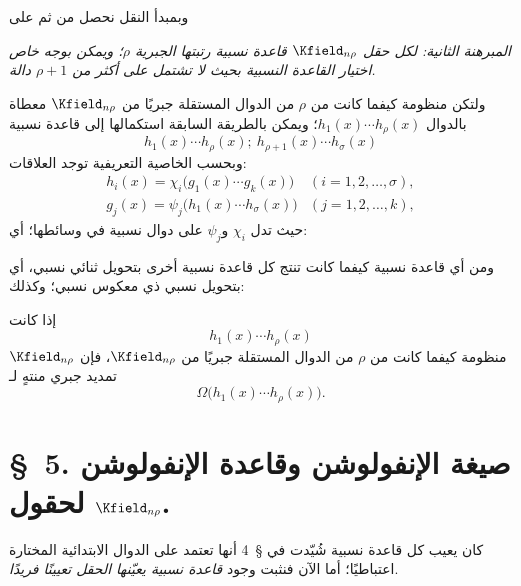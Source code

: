 \documentclass[11pt]{article}
\begin{document}
وبمبدأ النقل نحصل من ثم على

\emph{المبرهنة الثانية: لكل حقل $\Kfield_{n\rho}$ قاعدة نسبية رتبتها الجبرية $\rho$؛ ويمكن بوجه خاص اختيار القاعدة النسبية بحيث لا تشتمل على أكثر من $\rho+1$ دالة.}

ولتكن منظومة كيفما كانت من $\rho$ من الدوال المستقلة جبريًا من $\Kfield_{n\rho}$ معطاة بالدوال $h_1(x)\cdots h_\rho(x)$؛ ويمكن بالطريقة السابقة استكمالها إلى قاعدة نسبية
\[
h_1(x)\cdots h_\rho(x);\ h_{\rho+1}(x)\cdots h_\sigma(x)
\]
وبحسب الخاصية التعريفية توجد العلاقات:
\[
\begin{array}{ll}
h_i(x)=\chi_i\bigl(g_1(x)\cdots g_k(x)\bigr)&(i=1,2,\ldots,\sigma),\\
g_j(x)=\psi_j\bigl(h_1(x)\cdots h_\sigma(x)\bigr)&(j=1,2,\ldots,k),
\end{array}
\]
حيث تدل $\chi_i$ و$\psi_j$ على دوال نسبية في وسائطها؛ أي:

ومن أي قاعدة نسبية كيفما كانت تنتج كل قاعدة نسبية أخرى بتحويل ثنائي نسبي، أي بتحويل نسبي ذي معكوس نسبي؛ وكذلك:

إذا كانت
\[
h_1(x)\cdots h_\rho(x)
\]
منظومة كيفما كانت من $\rho$ من الدوال المستقلة جبريًا من $\Kfield_{n\rho}$، فإن $\Kfield_{n\rho}$ تمديد جبري منتهٍ لـ
\[
\Omega\bigl(h_1(x)\cdots h_\rho(x)\bigr).
\]

\section*{\S\ 5. صيغة الإنفولوشن وقاعدة الإنفولوشن لحقول $\Kfield_{n\rho}$.}

كان يعيب كل قاعدة نسبية شُيّدت في \S\ 4 أنها تعتمد على الدوال الابتدائية المختارة اعتباطيًا؛ أما الآن فنثبت وجود \emph{قاعدة نسبية يعيّنها الحقل تعيينًا فريدًا}.
\end{document}
